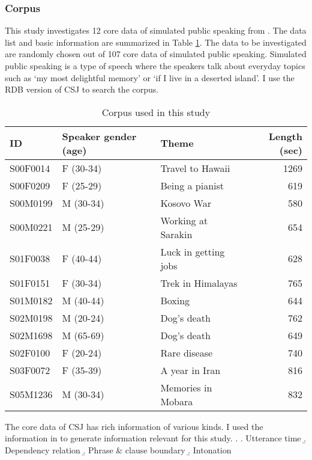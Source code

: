 \subsubsection{Corpus}\label{FW:Cor:Cor}

This study investigates 12 core data of simulated public speaking 
from  \cite[CSJ:][]{maekawa03,maekawaetal04}.
The data list and basic information are summarized in Table \ref{CorpusInfoT}.
The data to be investigated are randomly chosen out of 107 core data of simulated public speaking.
Simulated public speaking is a type of speech
where the speakers talk about everyday topics
such as `my most delightful memory' or `if I live in a deserted island'.
I use the RDB version of CSJ \cite{koisoetal12} to search the corpus.

\begin{table}
	\begin{center}
	\caption{Corpus used in this study}
	\label{CorpusInfoT}
	\begin{tabular}{lllr}
	\toprule
	ID & Speaker gender (age) & Theme & Length (sec) \\
	\midrule
	S00F0014 & F (30-34) & Travel to Hawaii & 1269 \\
	S00F0209 & F (25-29) & Being a pianist & 619 \\
	S00M0199 & M (30-34) & Kosovo War & 580 \\
	S00M0221 & M (25-29) & Working at Sarakin & 654 \\
	S01F0038 & F (40-44) & Luck in getting jobs & 628 \\
	S01F0151 & F (30-34) & Trek in Himalayas & 765 \\
	S01M0182 & M (40-44) & Boxing & 644 \\
	S02M0198 & M (20-24) & Dog's death & 762 \\
	S02M1698 & M (65-69) & Dog's death & 649 \\
	S02F0100 & F (20-24) & Rare disease & 740 \\
	S03F0072 & F (35-39) & A year in Iran & 816 \\
	S05M1236 & M (30-34) & Memories in Mobara & 832 \\
	\bottomrule
	\end{tabular}
	\end{center}
\end{table}

The core data of CSJ has rich information of various kinds.
I used the information in \Next to generate information relevant for this study.
%
\ex.
 \a. Utterance time
 \b. Dependency relation
 \b. Phrase \& clause boundary
 \b. Intonation

